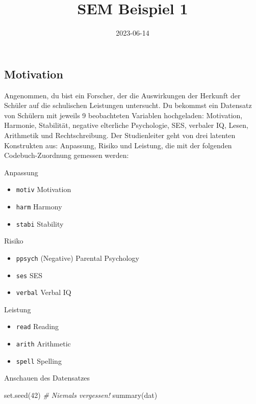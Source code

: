 \documentclass[
]{article}
\title{SEM Beispiel 1}
\author{}
\date{\vspace{-2.5em}2023-06-14}
\newenvironment{Shaded}{\begin{snugshade}}{\end{snugshade}}
\newcommand{\CommentTok}[1]{\textcolor[rgb]{0.56,0.35,0.01}{\textit{#1}}}
\newcommand{\DecValTok}[1]{\textcolor[rgb]{0.00,0.00,0.81}{#1}}
\newcommand{\FunctionTok}[1]{\textcolor[rgb]{0.00,0.00,0.00}{#1}}
\newcommand{\NormalTok}[1]{#1}
\providecommand{\tightlist}{%
  \setlength{\itemsep}{0pt}\setlength{\parskip}{0pt}}
\begin{document}
\maketitle

\hypertarget{motivation}{%
\subsection{Motivation}\label{motivation}}

Angenommen, du bist ein Forscher, der die Auswirkungen der Herkunft der
Schüler auf die schulischen Leistungen untersucht. Du bekommst ein
Datensatz von Schülern mit jeweils 9 beobachteten Variablen hochgeladen:
Motivation, Harmonie, Stabilität, negative elterliche Psychologie, SES,
verbaler IQ, Lesen, Arithmetik und Rechtschreibung. Der Studienleiter
geht von drei latenten Konstrukten aus: Anpassung, Risiko und Leistung,
die mit der folgenden Codebuch-Zuordnung gemessen werden:

Anpassung

\begin{itemize}
\tightlist
\item
  \texttt{motiv} Motivation
\item
  \texttt{harm} Harmony
\item
  \texttt{stabi} Stability
\end{itemize}

Risiko

\begin{itemize}
\tightlist
\item
  \texttt{ppsych} (Negative) Parental Psychology
\item
  \texttt{ses} SES
\item
  \texttt{verbal} Verbal IQ
\end{itemize}

Leistung

\begin{itemize}
\tightlist
\item
  \texttt{read} Reading
\item
  \texttt{arith} Arithmetic
\item
  \texttt{spell} Spelling
\end{itemize}

Anschauen des Datensatzes

\begin{Shaded}
\begin{Highlighting}[]
\FunctionTok{set.seed}\NormalTok{(}\DecValTok{42}\NormalTok{)    }\CommentTok{\# Niemals vergessen!}
\FunctionTok{summary}\NormalTok{(dat)}
\end{Highlighting}
\end{Shaded}
\end{document}
